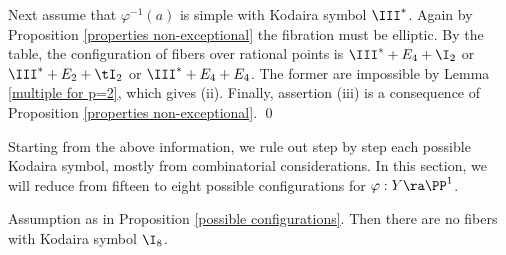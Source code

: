 Next assume that $\varphi^{-1}(a)$ is simple with Kodaira symbol $\III^*$.
Again by Proposition \ref{properties non-exceptional} the fibration must be elliptic. By the table, the configuration
of fibers over rational points is $\III^*+E_4+\I_2$ or  $\III^*+E_2+\tI_2$ or $\III^*+E_4+E_4$.
The former are impossible by Lemma \ref{multiple for p=2}, which gives (ii).
Finally, assertion (iii) is a consequence of    Proposition \ref{properties non-exceptional}.
\qed


Starting from the above information, we rule out step by step each possible Kodaira symbol,
mostly from combinatorial considerations.  In this section, we will reduce
from fifteen to eight possible configurations for $\varphi:Y\ra\PP^1$.

\begin{proposition}
\notready
\label{no I8}
Assumption as in Proposition \ref{possible configurations}.
Then there are no fibers with   Kodaira symbol $\I_8$.
\end{proposition}

